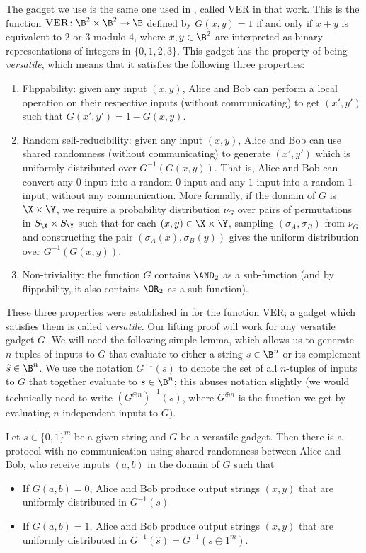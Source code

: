 The gadget we use is the same one used in \cite{GP18},
called \textsc{VER} in that work. This is the function
$\textsc{VER}\colon\B^2\times\B^2\to\B$ defined by $G(x,y)=1$
if and only if $x+y$ is equivalent to $2$ or $3$ modulo $4$,
where $x,y\in\B^2$ are interpreted as binary representations
of integers in $\{0,1,2,3\}$. This gadget has the property
of being \emph{versatile}, which means that it satisfies
the following three properties:
\begin{enumerate}
\item Flippability: given any input $(x,y)$, Alice
and Bob can perform a local operation on their respective inputs (without communicating)
to get $(x',y')$ such that $G(x',y')=1-G(x,y)$.
\item Random self-reducibility: given any input $(x,y)$,
Alice and Bob can use shared randomness (without communicating)
to generate $(x',y')$ which is uniformly distributed over
$G^{-1}(G(x,y))$. That is, Alice and Bob can convert any $0$-input
into a random $0$-input and any $1$-input into a random $1$-input,
without any communication. More formally,
if the domain of $G$ is $\X\times \Y$,
we require a probability distribution $\nu_G$
over pairs of permutations in $S_{\X}\times S_{\Y}$
such that for each $(x,y)\in\X\times\Y$,
sampling $(\sigma_A,\sigma_B)$ from $\nu_G$
and constructing the pair $(\sigma_A(x),\sigma_B(y))$
gives the uniform distribution over $G^{-1}(G(x,y))$.
\item Non-triviality: the function $G$ contains $\AND_2$
as a sub-function (and by flippability, it also contains
$\OR_2$ as a sub-function).
\end{enumerate}

These three properties were established in \cite{GP18} for
the function \textsc{VER}; a gadget which satisfies
them is called \emph{versatile}.
Our lifting proof will work for any versatile gadget $G$.
We will need the following simple lemma, which allows
us to generate $n$-tuples of inputs to $G$ that evaluate
to either a string $s\in\B^n$ or its complement
$\hat{s}\in\B^n$. We use the notation $G^{-1}(s)$
to denote the set of all $n$-tuples of inputs to $G$
that together evaluate to $s\in\B^n$; this abuses
notation slightly (we would technically need to write
$(G^{\oplus n})^{-1}(s)$, where $G^{\oplus n}$ is
the function we get by evaluating $n$ independent inputs
to $G$).

\begin{lemma}\label{lem:s-sampling}
Let $s\in\{0,1\}^m$ be a given string and $G$ be a versatile gadget. Then there is a protocol with no communication using shared randomness between Alice and Bob, who receive inputs $(a,b)$ in the domain of $G$ such that
\begin{itemize}
 \item If $G(a,b)=0$, Alice and Bob produce output strings $(x,y)$ that are uniformly distributed in $G^{-1}(s)$
 \item If $G(a,b)=1$, Alice and Bob produce output strings $(x,y)$ that are uniformly distributed in $G^{-1}(\hat{s}) = G^{-1}(s\oplus1^m)$.
\end{itemize}
\end{lemma}

